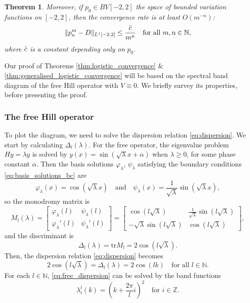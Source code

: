 \documentclass[a4paper]{article}
\newtheorem{theorem}{Theorem}%
\theoremstyle{definition}
\numberwithin{equation}{section}
\numberwithin{theorem}{section}
\newcommand{\tr}{\mathrm{tr}}
\begin{document}
{\begin{theorem}
    Moreover, if $p_0\in BV[-2,2]$ the space of bounded variation functions on $[-2,2]$, then the convergence rate is at least $O(m^{-n})$:
    \begin{equation} \label{eq:exponential_convergence}
        \lVert p_n^m-D\rVert_{ L^1[-2,2]}\leq \frac{\Tilde{c}}{m^{n}}\quad\text{for all $m,n\in\mathbb{N}$,}
    \end{equation}
    where $\Tilde{c}$ is a constant depending only on $p_0$.
\end{theorem}

Our proof of Theorems \ref{thm:logistic_convergence} \& \ref{thm:generalised_logistic_convergence} will be based on the spectral band diagram of the free Hill operator with $V\equiv0$. We briefly survey its properties, before presenting the proof. 

\subsubsection{The free Hill operator}

To plot the diagram, we need to solve the dispersion relation \eqref{eq:dispersion}. We start by calculating $\Delta_l(\lambda)$. For the free operator, the eigenvalue problem $Hy = \lambda y$ is solved by $y(x) = \sin{(\sqrt{\lambda} x + \alpha)}$ when $\lambda\geq0$, for some phase constant $\alpha$. Then the basis solutions $\varphi_\lambda$, $\psi_\lambda$ satisfying the boundary conditions \eqref{eq:basis_solutions_bc} are
\begin{equation*}
    \varphi_\lambda(x)=\cos(\sqrt{\lambda} x)\quad\text{and}\quad \psi_\lambda(x)=\frac{1}{\sqrt{\lambda}}\sin(\sqrt{\lambda} x),
\end{equation*}
so the monodromy matrix is
\begin{equation*}
    M_l(\lambda)=\begin{bmatrix}
\varphi_\lambda(l) & \psi_\lambda(l) \\
\varphi_\lambda'(l) & \psi_\lambda'(l) 
\end{bmatrix}
= \begin{bmatrix}
\cos(l\sqrt{\lambda}) & \frac{1}{\sqrt{\lambda}}\sin(l\sqrt{\lambda}) \\
-\sqrt{\lambda}\sin(l\sqrt{\lambda}) & \cos(l\sqrt{\lambda})
\end{bmatrix},
\end{equation*}
and the discriminant is
\begin{equation*}
    \Delta_l(\lambda)= \tr M_l=2\cos(l\sqrt{\lambda}).
\end{equation*}
Then, the dispersion relation \eqref{eq:dispersion} becomes
\begin{equation} \label{eq:free_dispersion}
    2\cos(l\sqrt{\lambda}) = \Delta_l(\lambda) = 2\cos(lk)\quad\text{for all $l\in\mathbb{N}$.}
\end{equation}
For each $l\in\mathbb{N}$, \eqref{eq:free_dispersion} can be solved by the band functions
\begin{equation} \label{eq:free_band_functions}
    \lambda_i^l(k) = \left(k+\frac{2\pi}{l} i\right)^2\quad\text{for $i\in\mathbb{Z}$.}
\end{equation}

}
\end{document}
